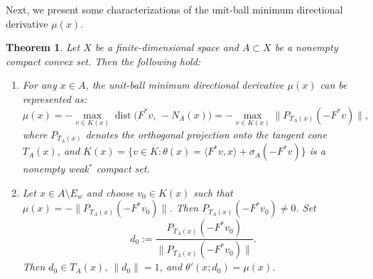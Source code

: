 \documentclass[11pt]{article}
\newtheorem{theorem}{Theorem}[section]
\begin{document}
Next,   we  present some characterizations of the unit-ball minimum directional derivative \(\mu(x)\).

\begin{theorem} 
	Let $X$ be a finite-dimensional space and  $A\subset X$ be a nonempty compact convex set.
	Then the following hold:
	\begin{enumerate}
		\item[(i)]  For any \(x \in A\), 	the unit-ball minimum directional derivative \(\mu(x)\) can be represented as:
		\[
		\mu(x)=-\max_{v\in K(x)}\operatorname{dist}\bigl(F^*v,\,-N_A(x)\bigr)=-\max_{v\in K(x)}\bigl\|P_{T_A(x)}(-F^*v)\bigr\|,
		\]
		  where \(P_{T_A(x)}\) denotes the orthogonal projection onto the tangent cone \(T_A(x)\),  and  $K(x)=\{v\in K:\theta(x)=\langle F^*v,x\rangle+\sigma_A(-F^*v)\}$ is a nonempty weak$^*$ compact set.  
	
		\item[(ii)]
		Let $x\in A\setminus E_w$ and choose $v_0\in K(x)$ such that $\mu(x)= - \bigl\|P_{T_A(x)}(-F^* v_0)\bigr\|$. Then $P_{T_A(x)}(-F^*v_0)\neq 0$. Set
		\[
		d_0:=\frac{P_{T_A(x)}(-F^*v_0)}{\|P_{T_A(x)}(-F^*v_0)\|}.
		\]
		Then $d_0\in T_A(x)$, $\|d_0\|=1$, and
	$		\theta'(x;d_0)=\mu(x).	$
	\end{enumerate}
\end{theorem}
\end{document}
